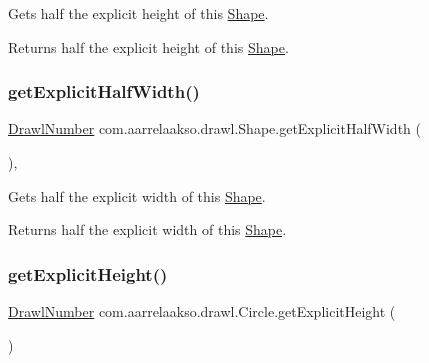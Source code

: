 Gets half the explicit height of this \hyperlink{classcom_1_1aarrelaakso_1_1drawl_1_1_shape}{Shape}. 

\begin{DoxyReturn}{Returns}
half the explicit height of this \hyperlink{classcom_1_1aarrelaakso_1_1drawl_1_1_shape}{Shape}. 
\end{DoxyReturn}
\mbox{\label{classcom_1_1aarrelaakso_1_1drawl_1_1_shape_af952f32cb1706da71c9cb75916f4d665}} 
\subsubsection{\texorpdfstring{get\+Explicit\+Half\+Width()}{getExplicitHalfWidth()}}
{\footnotesize\ttfamily \hyperlink{classcom_1_1aarrelaakso_1_1drawl_1_1_drawl_number}{Drawl\+Number} com.\+aarrelaakso.\+drawl.\+Shape.\+get\+Explicit\+Half\+Width (\begin{DoxyParamCaption}{ }\end{DoxyParamCaption})\hspace{0.3cm}{\ttfamily [protected]}, {\ttfamily [inherited]}}



Gets half the explicit width of this \hyperlink{classcom_1_1aarrelaakso_1_1drawl_1_1_shape}{Shape}. 

\begin{DoxyReturn}{Returns}
half the explicit width of this \hyperlink{classcom_1_1aarrelaakso_1_1drawl_1_1_shape}{Shape}. 
\end{DoxyReturn}
\mbox{\label{classcom_1_1aarrelaakso_1_1drawl_1_1_circle_a7754ee3923393a342e734a91bd094d25}} 
\subsubsection{\texorpdfstring{get\+Explicit\+Height()}{getExplicitHeight()}}
{\footnotesize\ttfamily \hyperlink{classcom_1_1aarrelaakso_1_1drawl_1_1_drawl_number}{Drawl\+Number} com.\+aarrelaakso.\+drawl.\+Circle.\+get\+Explicit\+Height (\begin{DoxyParamCaption}{ }\end{DoxyParamCaption})}



